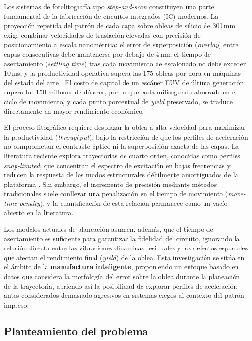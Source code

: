 \documentclass[11pt]{article}
\begin{document}
Los sistemas de fotolitografía tipo \textit{step-and-scan} constituyen una parte fundamental de la fabricación de circuitos integrados (IC) modernos. La proyección repetida del patrón de cada capa sobre obleas de silicio de 300\,mm exige combinar velocidades de traslación elevadas con precisión de posicionamiento a escala nanométrica: el error de superposición (\textit{overlay}) entre capas consecutivas debe mantenerse por debajo de 4\,nm, el tiempo de asentamiento (\textit{settling time}) tras cada movimiento de escalonado no debe exceder 10\,ms, y la productividad operativa supera las 175 obleas por hora en máquinas del estado del arte \cite{Butler2011_PositionControl,Schmidt2012_UltraPrecision}. El costo de capital de un escáner EUV de última generación supera los 150 millones de dólares, por lo que cada milisegundo ahorrado en el ciclo de movimiento, y cada punto porcentual de \textit{yield} preservado, se traduce directamente en mayor rendimiento económico.

El proceso litográfico requiere desplazar la oblea a alta velocidad para maximizar la productividad (\textit{throughput}), bajo la restricción de que los perfiles de aceleración no comprometan el contraste óptico ni la superposición exacta de las capas. La literatura reciente explora trayectorias de cuarto orden, conocidas como perfiles \textit{snap-limited}, que concentran el espectro de excitación en bajas frecuencias y reducen la respuesta de los modos estructurales débilmente amortiguados de la plataforma \cite{Al-Rawashdeh2023a,Heertjes2023_CDC}. Sin embargo, el incremento de precisión mediante métodos tradicionales suele conllevar una penalización en el tiempo de movimiento (\textit{move-time penalty}), y la cuantificación de esta relación permanece como un vacío abierto en la literatura.

Los modelos actuales de planeación asumen, además, que el tiempo de asentamiento es suficiente para garantizar la fidelidad del circuito, ignorando la relación directa entre las vibraciones dinámicas residuales y los defectos espaciales que afectan el rendimiento final (\textit{yield}) de la oblea. Esta investigación se sitúa en el ámbito de la \textbf{manufactura inteligente}, proponiendo un enfoque basado en datos que considera la morfología del error sobre la oblea durante la planeación de la trayectoria, abriendo así la posibilidad de explorar perfiles de aceleración antes considerados demasiado agresivos en sistemas ciegos al contexto del patrón impreso.

\subsection*{Planteamiento del problema}
\end{document}
